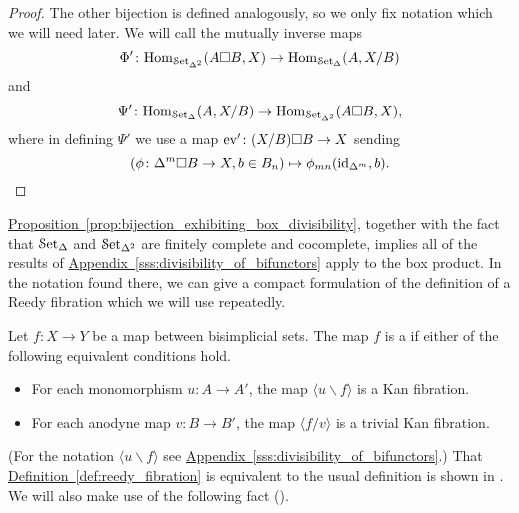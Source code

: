 \documentclass[main.tex]{subfiles}
\begin{document}
\begin{proof}
  The other bijection is defined analogously, so we only fix notation which we will need later. We will call the mutually inverse maps
  \begin{equation*}
    \Phi'\colon \mathrm{Hom}_{\mathcal{S}\mathrm{et}_{\Delta^{2}}}(A \square B, X) \to \mathrm{Hom}_{\mathcal{S}\mathrm{et}_{\Delta}}(A, X / B)
  \end{equation*}
  and
  \begin{equation*}
    \Psi'\colon \mathrm{Hom}_{\mathcal{S}\mathrm{et}_{\Delta}}(A, X / B) \to \mathrm{Hom}_{\mathcal{S}\mathrm{et}_{\Delta^{2}}}(A \square B, X),
  \end{equation*}
  where in defining $\Psi'$ we use a map $\mathrm{ev}'\colon (X / B) \square B \to X$ sending
  \begin{equation*}
    (\phi\colon \Delta^{m} \square B \to X, b \in B_{n}) \mapsto \phi_{mn}(\mathrm{id}_{\Delta^{m}}, b).\qedhere
  \end{equation*}
\end{proof}


\hyperref[prop:bijection_exhibiting_box_divisibility]{Proposition~\ref*{prop:bijection_exhibiting_box_divisibility}}, together with the fact that $\mathcal{S}\mathrm{et}_{\Delta}$ and $\mathcal{S}\mathrm{et}_{\Delta^{2}}$ are finitely complete and cocomplete, implies all of the results of \hyperref[sss:divisibility_of_bifunctors]{Appendix~\ref*{sss:divisibility_of_bifunctors}} apply to the box product. In the notation found there, we can give a compact formulation of the definition of a Reedy fibration which we will use repeatedly.

\begin{definition}
  \label{def:reedy_fibration}
  Let $f\colon X \to Y$ be a map between bisimplicial sets. The map $f$ is a  if either of the following equivalent conditions hold.
  \begin{itemize}
    \item For each monomorphism $u\colon A \to A'$, the map $\langle u \backslash f \rangle$ is a Kan fibration.

    \item For each anodyne map $v\colon B \to B'$, the map $\langle f / v \rangle$ is a trivial Kan fibration.
  \end{itemize}
\end{definition}

(For the notation $\langle u \backslash f \rangle$ see \hyperref[sss:divisibility_of_bifunctors]{Appendix~\ref*{sss:divisibility_of_bifunctors}}.) That \hyperref[def:reedy_fibration]{Definition~\ref*{def:reedy_fibration}} is equivalent to the usual definition is shown in \cite[Prop.\ 3.4]{qcats_vs_segal_spaces}. We will also make use of the following fact (\cite[Prop.\ 3.10]{qcats_vs_segal_spaces}).
\end{document}
